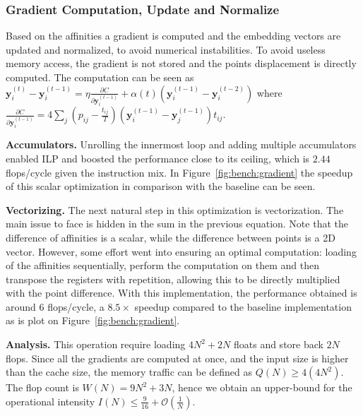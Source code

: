 \documentclass[letterpaper]{article}
\newcommand{\mypar}[1]{{\bf #1.}}
\begin{document}
\subsubsection{Gradient Computation, Update and Normalize}
Based on the affinities a gradient is computed and the embedding vectors are updated and normalized, to avoid numerical instabilities.
To avoid useless memory access, the gradient is not stored and the points displacement is directly computed. The computation can be seen as $\mathbf{y}_i^{(t)} - \mathbf{y}_i^{(t-1)} = \eta \frac{\partial C}{\partial \mathbf{y}_i^{(t-1)}} + \alpha(t) (\mathbf{y}_i^{(t-1)} - \mathbf{y}_i^{(t-2)}) $ where
$\frac{\partial C}{\partial \mathbf{y}_i^{(t-1)}} = 4 \sum_j (p_{ij} - \frac{t_{ij}}{T}) (\mathbf{y}_i^{(t-1)} - \mathbf{y}_j^{(t-1)}) t_{ij}$.

\mypar{Accumulators}
Unrolling the innermost loop and adding multiple accumulators enabled ILP and boosted the performance close to its ceiling, which is $2.44$ flops/cycle given the instruction mix. In Figure~\ref{fig:bench:gradient} the speedup of this scalar optimization in comparison with the baseline can be seen.

\mypar{Vectorizing}
The next natural step in this optimization is vectorization. The main issue to face is hidden in the sum in the previous equation. Note that the difference of affinities is a scalar, while the difference between points is a 2D vector. However, some effort went into ensuring an optimal computation: loading of the affinities sequentially, perform the computation on them and then transpose the registers with repetition, allowing this to be directly multiplied with the point difference. With this implementation, the performance obtained is around $6$ flops/cycle, a $8.5\times$ speedup compared to the baseline implementation as is plot on Figure~\ref{fig:bench:gradient}.

\mypar{Analysis}
This operation require loading $4N^2 + 2N$ floats and store back $2N$ flops. Since all the gradients are computed at once, and the input size is higher than the cache size, the memory traffic can be defined as $Q(N) \geq 4(4N^2)$. The flop count is $W(N) = 9N^2+3N$, hence we obtain an upper-bound for the operational intensity $I(N) \leq \frac{9}{16} + \mathcal{O}(\frac{1}{N})$.
\end{document}
